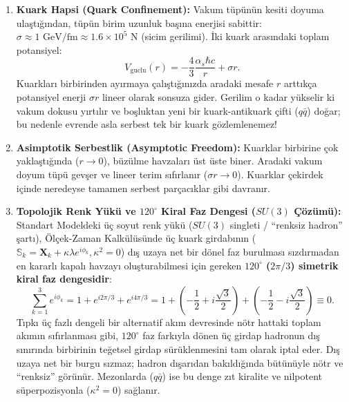 \begin{enumerate}
    \item \textbf{Kuark Hapsi (Quark Confinement):}
          Vakum tüpünün kesiti doyuma ulaştığından, tüpün birim uzunluk başına enerjisi sabittir: $\sigma \approx 1\text{ GeV/fm} \approx 1.6 \times 10^5\text{ N}$ (sicim gerilimi). İki kuark arasındaki toplam potansiyel:
          \begin{equation}
              V_{\mathrm{guclu}}(r) = -\frac{4}{3}\frac{\alpha_s \hbar c}{r} + \sigma r.
              \label{eq:guclu_potansiyel}
          \end{equation}
          Kuarkları birbirinden ayırmaya çalıştığınızda aradaki mesafe $r$ arttıkça potansiyel enerji $\sigma r$ lineer olarak sonsuza gider. Gerilim o kadar yükselir ki vakum dokusu yırtılır ve boşluktan yeni bir kuark-antikuark çifti ($q\bar{q}$) doğar; bu nedenle evrende asla serbest tek bir kuark gözlemlenemez!

    \item \textbf{Asimptotik Serbestlik (Asymptotic Freedom):}
          Kuarklar birbirine çok yaklaştığında ($r \to 0$), büzülme havzaları üst üste biner. Aradaki vakum doyum tüpü gevşer ve lineer terim sıfırlanır ($\sigma r \to 0$). Kuarklar çekirdek içinde neredeyse tamamen serbest parçacıklar gibi davranır.

    \item \textbf{Topolojik Renk Yükü ve $120^\circ$ Kiral Faz Dengesi ($SU(3)$ Çözümü):}
          Standart Modeldeki üç soyut renk yükü ($SU(3)$ singleti / ``renksiz hadron'' şartı), Ölçek-Zaman Kalkülüsünde üç kuark girdabının ($\mathbb{S}_k = \mathbf{X}_k + \kappa \lambda e^{i \phi_k}, \kappa^2 = 0$) dış uzaya net bir dönel faz burulması sızdırmadan en kararlı kapalı havzayı oluşturabilmesi için gereken \textbf{$120^\circ$ ($2\pi/3$) simetrik kiral faz dengesidir}:
          \begin{equation}
              \sum_{k=1}^3 e^{i \phi_k} = 1 + e^{i 2\pi/3} + e^{i 4\pi/3} = 1 + \left( -\frac{1}{2} + i\frac{\sqrt{3}}{2} \right) + \left( -\frac{1}{2} - i\frac{\sqrt{3}}{2} \right) \equiv 0.
              \label{eq:renk_faz_toplami_main}
          \end{equation}
          Tıpkı üç fazlı dengeli bir alternatif akım devresinde nötr hattaki toplam akımın sıfırlanması gibi, $120^\circ$ faz farkıyla dönen üç girdap hadronun dış sınırında birbirinin teğetsel girdap sürüklenmesini tam olarak iptal eder. Dış uzaya net bir burgu sızmaz; hadron dışarıdan bakıldığında bütünüyle nötr ve ``renksiz'' görünür. Mezonlarda ($q\bar{q}$) ise bu denge zıt kiralite ve nilpotent süperpozisyonla ($\kappa^2 = 0$) sağlanır.
\end{enumerate}

